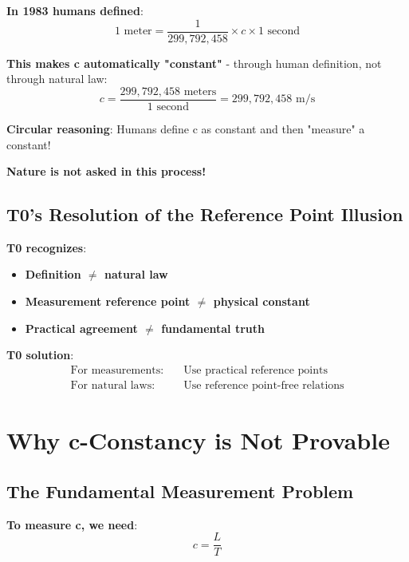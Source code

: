 \documentclass[12pt,a4paper]{article}
\begin{document}
	\textbf{In 1983 humans defined}:
	\begin{equation}
		1 \text{ meter} = \frac{1}{299,792,458} \times c \times 1 \text{ second}
	\end{equation}
	
	\textbf{This makes c automatically "constant"} - through human definition, not through natural law:
	\begin{equation}
		c = \frac{299,792,458 \text{ meters}}{1 \text{ second}} = 299,792,458 \text{ m/s}
	\end{equation}
	
	\textbf{Circular reasoning}: Humans define c as constant and then "measure" a constant!
	
	\textbf{Nature is not asked in this process!}
	
	\subsection{T0's Resolution of the Reference Point Illusion}
	
	\textbf{T0 recognizes}:
	\begin{itemize}
		\item \textbf{Definition $\neq$ natural law}
		\item \textbf{Measurement reference point $\neq$ physical constant}
		\item \textbf{Practical agreement $\neq$ fundamental truth}
	\end{itemize}
	
	\textbf{T0 solution}:
	\begin{align}
		\text{For measurements:} \quad &\text{Use practical reference points} \\
		\text{For natural laws:} \quad &\text{Use reference point-free relations}
	\end{align}
	
	\section{Why c-Constancy is Not Provable}
	
	\subsection{The Fundamental Measurement Problem}
	
	\textbf{To measure c, we need}:
	\begin{equation}
		c = \frac{L}{T}
	\end{equation}
	
\end{document}
